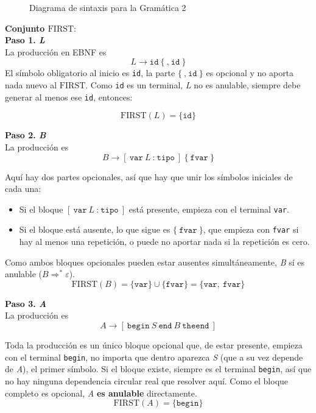 \documentclass[12pt,letterpaper]{article}
\newcommand{\nt}[1]{\textit{#1}}
\newcommand{\tk}[1]{\texttt{#1}}
\newcommand{\First}[1]{\mathrm{FIRST}(#1)}
\newcommand{\eps}{\varepsilon}
\begin{document}
\begin{enumerate}[label=\arabic*.]
\begin{itemize}
    \begin{figure}[ht]
      \centering
      
      \caption{Diagrama de sintaxis para la Gramática 2}
      \label{fig:diagrama_sintaxis}
    \end{figure}
        
    \newpage
    
    \textbf{\large Conjunto $\mathrm{FIRST}$}:\\

    \textbf{Paso 1. \nt{L}}\\
    La producción en EBNF es
    \[
    \nt{L} \to \tk{id}\ \{\ \tk{,}\ \tk{id}\ \}
    \]
    El símbolo obligatorio al inicio es \tk{id}, la parte $\{\ \tk{,}\ \tk{id}\ \}$ es opcional y no aporta nada nuevo al $\mathrm{FIRST}$. Como \tk{id} es un terminal, \nt{L} no es anulable, siempre debe generar al menos ese \tk{id}, entonces:

    \[
    \First{\nt{L}} = \{\tk{id}\}
    \]

    \textbf{Paso 2. \nt{B}}\\
    La producción es
    \[
    \nt{B} \to [\ \tk{var}\ \nt{L}\ \tk{:}\ \tk{tipo}\ ]\ \{\ \tk{fvar}\ \}
    \]
    
    Aquí hay dos partes opcionales, así que hay que unir los símbolos iniciales de cada una:
    \begin{itemize}[leftmargin=*]
    \item Si el bloque $[\ \tk{var}\ \nt{L}\ \tk{:}\ \tk{tipo}\ ]$ está presente, empieza con el terminal
      \tk{var}.
      
    \item Si el bloque está ausente, lo que sigue es $\{\ \tk{fvar}\ \}$, que empieza con \tk{fvar} si hay al
      menos una repetición, o puede no aportar nada si la repetición es cero.
    \end{itemize}
    
    Como ambos bloques opcionales pueden estar ausentes simultáneamente, \nt{B} sí es anulable ($\nt{B} \Rightarrow^* \eps$).
    \[
    \First{\nt{B}} = \{\tk{var}\} \cup \{\tk{fvar}\} = \{\tk{var},\ \tk{fvar}\}
    \]

    \textbf{Paso 3. \nt{A}}\\
    La producción es
    \[
    \nt{A} \to [\ \tk{begin}\ \nt{S}\ \tk{end}\ \nt{B}\ \tk{theend}\ ]
    \]
    
    Toda la producción es un único bloque opcional que, de estar presente, empieza con el terminal \tk{begin},
    no importa que dentro aparezca \nt{S} (que a su vez depende de \nt{A}), el primer símbolo. Si el bloque
    existe, siempre es el terminal \tk{begin}, así que no hay ninguna dependencia circular real que resolver
    aquí. Como el bloque completo es opcional, \nt{A} \textbf{es anulable} directamente.
    \[
    \First{\nt{A}} = \{\tk{begin}\}
    \]


\end{itemize}
\end{enumerate}
\end{document}
